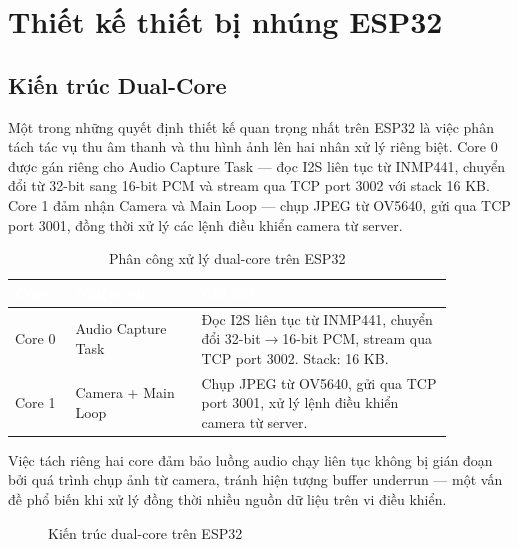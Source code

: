 \section{Thiết kế thiết bị nhúng ESP32}

\subsection{Kiến trúc Dual-Core}

Một trong những quyết định thiết kế quan trọng nhất trên ESP32 là việc phân
tách tác vụ thu âm thanh và thu hình ảnh lên hai nhân xử lý riêng biệt.
Core 0 được gán riêng cho Audio Capture Task --- đọc I2S liên tục từ INMP441,
chuyển đổi từ 32-bit sang 16-bit PCM và stream qua TCP port 3002 với stack
16 KB. Core 1 đảm nhận Camera và Main Loop --- chụp JPEG từ OV5640, gửi qua
TCP port 3001, đồng thời xử lý các lệnh điều khiển camera từ server.

\begin{table}[htbp]
\centering
\caption{Phân công xử lý dual-core trên ESP32}
\label{tab:dual-core}
\begin{tabular}{>{\centering\arraybackslash}p{0.12\linewidth} >{\raggedright\arraybackslash}p{0.25\linewidth} >{\raggedright\arraybackslash}p{0.5\linewidth}}
\toprule
\rowcolor{headerblue} \textcolor{white}{\textbf{Core}} & \textcolor{white}{\textbf{Nhiệm vụ}} & \textcolor{white}{\textbf{Chi tiết}} \\
\midrule
\rowcolor{rowgray} Core 0 & Audio Capture Task & Đọc I2S liên tục từ INMP441, chuyển đổi 32-bit$\rightarrow$16-bit PCM, stream qua TCP port 3002. Stack: 16 KB. \\
Core 1 & Camera + Main Loop & Chụp JPEG từ OV5640, gửi qua TCP port 3001, xử lý lệnh điều khiển camera từ server. \\
\bottomrule
\end{tabular}
\end{table}

Việc tách riêng hai core đảm bảo luồng audio chạy liên tục không bị gián đoạn
bởi quá trình chụp ảnh từ camera, tránh hiện tượng buffer underrun --- một vấn
đề phổ biến khi xử lý đồng thời nhiều nguồn dữ liệu trên vi điều khiển.

\begin{figure}[htbp]
\centering
{}
\caption{Kiến trúc dual-core trên ESP32}
\label{fig:dual-core}
\end{figure}

